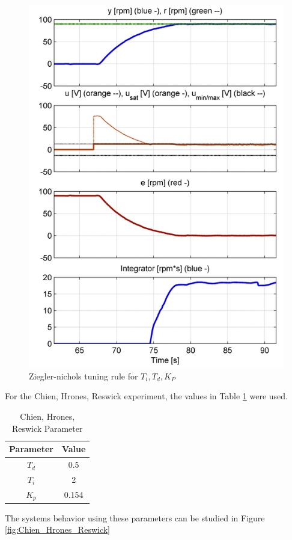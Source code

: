 \begin{figure}[H]
\begin{center}
\includegraphics[width=0.5\linewidth]{images/general/PID/Ziegler_nichols}
\end{center}
\caption{Ziegler-nichols tuning rule for $T_{i}, T_{d},K_{P}$}
\label{fig:Ziegler_nichols}
\end{figure}

For the Chien, Hrones, Reswick experiment, the values in Table \ref{tab:chr_params} were used.

\begin{table}[H]
\begin{center}
\begin{tabular}{ |c|c| } 
 \hline
 Parameter & Value\\
 \hline
 $T_{d}$ & 0.5\\  
 \hline
 $T_{i}$ & 2\\
 \hline
 $K_{p}$ & 0.154\\
 \hline
\end{tabular}
\end{center}
\caption{Chien, Hrones, Reswick Parameter}
\label{tab:chr_params}
\end{table}

The systems behavior using these parameters can be studied in Figure \ref{fig:Chien_Hrones_Reswick}

